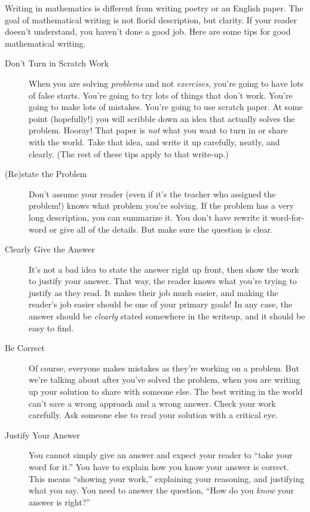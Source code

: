\documentclass[10pt, reqno]{amsart}
\theoremstyle{remark}
\theoremstyle{definition}
\numberwithin{equation}{section}  %
\begin{document}
Writing in mathematics is different from writing poetry or an English paper.  The goal of mathematical writing is not florid description, but clarity.  If your reader doesn't understand, you haven't done a good job.  Here are some tips for good mathematical writing.

\begin{description}
\item[Don't Turn in Scratch Work] When you are solving \emph{problems} and not \emph{exercises}, you're going to have lots of false starts.  You're going to try lots of things that don't work.  You're going to make lots of mistakes.  You're going to use scratch paper.  At some point (hopefully!) you will scribble down an idea that actually solves the problem.  Hooray!  That paper is \emph{not} what you want to turn in or share with the world.  Take that idea, and write it up carefully, neatly, and clearly.  (The rest of these tips apply to that write-up.)

\item[(Re)state the Problem]  Don't assume your reader (even if it's the teacher who assigned the problem!) knows what problem you're solving.  If the problem has a very long description, you can summarize it.  You don't have  rewrite it word-for-word or  give all of the details.  But make sure the question  is clear.

\item[Clearly Give the Answer] It's not a bad idea to state the answer right up front, then show the work to justify your answer.  That way, the reader knows what you're trying to justify as they read.  It makes their job much easier, and making the reader's job easier should be one of your primary goals!  In any case, the answer should be \emph{clearly} stated somewhere in the writeup, and it should be easy to find. 

\item[Be Correct] Of course, everyone makes mistakes as they're working on a problem.  But we're talking about after you've solved the problem, when you are writing up your solution to share with someone else.
The best writing in the world can't save a wrong approach and a wrong answer.  Check your work carefully.  Ask someone else to read your solution with a critical eye.  

\item[Justify Your Answer] You cannot simply give an answer and expect your reader to ``take your word for it.'' You have to explain how you know your answer is correct.  This means ``showing your work,'' explaining your reasoning, and justifying what you say.   You need to answer the question, ``How do you \emph{know} your answer is right?''


\end{description}
\end{document}
